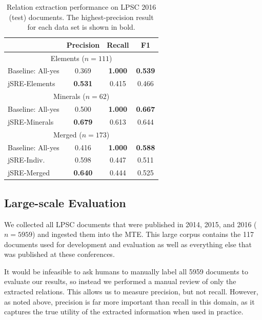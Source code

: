 \documentclass[letterpaper]{article} %
\begin{document}

\begin{table}
\caption{Relation extraction performance on LPSC 2016 (test) documents. 
The highest-precision result for each data set is shown in bold.}
\label{tab:re}
\begin{center}
\begin{tabular}{l|ccc}
 & Precision & Recall & F1 \\ \hline
\multicolumn{4}{c}{Elements ($n=111$)} \\
Baseline: All-yes & 0.369 & {\bf 1.000} & {\bf 0.539} \\ 
jSRE-Elements & {\bf 0.531} & 0.415 & 0.466 \\ \hline
\multicolumn{4}{c}{Minerals ($n=62$)} \\
Baseline: All-yes & 0.500 & {\bf 1.000} & {\bf 0.667} \\ 
jSRE-Minerals & {\bf 0.679} & 0.613 & 0.644 \\ \hline 
\multicolumn{4}{c}{Merged ($n=173$)} \\
Baseline: All-yes & 0.416 & {\bf 1.000} & {\bf 0.588} \\ 
jSRE-Indiv.  & 0.598 & 0.447 & 0.511 \\
jSRE-Merged  & {\bf 0.640} & 0.444 & 0.525 \\ \hline
\end{tabular}
\end{center}
\end{table}


\subsection{Large-scale Evaluation}

We collected all LPSC documents that were published in 2014, 2015, and
2016 ($n=5959$) and ingested them into the MTE.  This large corpus
contains the 117 documents used for development and evaluation as well
as everything else that was published at these conferences.


It would be infeasible to ask humans to manually label all 5959
documents to evaluate our results, so instead we performed a manual
review of only the extracted relations.  This allows us to measure
precision, but not recall.  However, as noted above, precision is far more
important than recall in this domain, as it captures the true utility
of the extracted information when used in practice.
\end{document}
